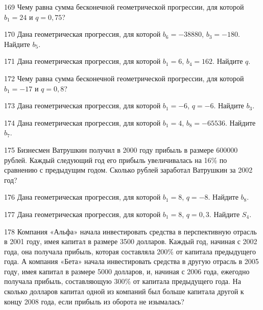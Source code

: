 \documentclass[4apaper]{article}
\begin{document}
\begin{taskBN}{169}
Чему равна сумма бесконечной геометрической прогрессии, для которой $b_1 = 24$ и $q=0,75$?
\end{taskBN}

\begin{taskBN}{170}
Дана геометрическая прогрессия, для которой $b_{6} = -38880$, $b_{3}=-180$. Найдите $b_{5}$.
\end{taskBN}

\begin{taskBN}{171}
Дана геометрическая прогрессия, для которой $b_1 = 6$, $b_{4}=162$. Найдите $q$.
\end{taskBN}

\begin{taskBN}{172}
Чему равна сумма бесконечной геометрической прогрессии, для которой $b_1 = -17$ и $q=0,8$?
\end{taskBN}

\begin{taskBN}{173}
Дана геометрическая прогрессия, для которой $b_1 = -6$, $q=-6$. Найдите $b_{3}$.
\end{taskBN}

\begin{taskBN}{174}
Дана геометрическая прогрессия, для которой $b_1 = 4$, $b_{8}=-65536$. Найдите $b_{7}$.
\end{taskBN}

\begin{taskBN}{175}
Бизнесмен Ватрушкин получил в 2000 году прибыль в размере 600000 рублей. Каждый следующий год его прибыль увеличивалась на 16\% по сравнению с предыдущим годом. Сколько рублей заработал Ватрушкин за 2002 год?
\end{taskBN}

\begin{taskBN}{176}
Дана геометрическая прогрессия, для которой $b_1 = 8$, $q=-8$. Найдите $b_{8}$.
\end{taskBN}

\begin{taskBN}{177}
Дана геометрическая прогрессия, для которой $b_1 = 8$, $q=0,3$. Найдите $S_{4}$.
\end{taskBN}

\begin{taskBN}{178}
Компания «Альфа» начала инвестировать средства в перспективную отрасль в 2001 году, имея капитал в размере 3500 долларов. Каждый год, начиная с 2002 года, она получала прибыль, которая составляла 200\% от капитала предыдущего года. А компания «Бета» начала инвестировать средства в другую отрасль в 2005 году, имея капитал в размере 5000 долларов, и, начиная с 2006 года, ежегодно получала прибыль, составляющую 300\% от капитала предыдущего года. На сколько долларов капитал одной из компаний был больше капитала другой к концу 2008 года, если прибыль из оборота не изымалась?
\end{taskBN}
\end{document}
